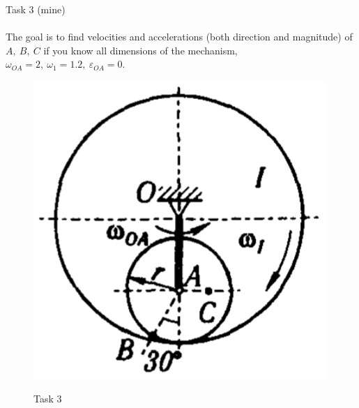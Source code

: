 \documentclass[aspectratio=169]{beamer}
\newcommand{\fbckg}[1]{\usebackgroundtemplate{\texttt{[image: \#1]}}}%
\begin{document}
\begin{frame}[t]{Task 3 (mine)}
    \framesubtitle{}
\begin{minipage}{0.6\textwidth}
The goal is to find velocities and accelerations (both direction and magnitude) of $A,\ B,\ C$ if you know all dimensions of the mechanism, $\omega_{OA}=2,\ \omega_1=1.2,\ \varepsilon_{OA}=0$.
\end{minipage}
\begin{minipage}{0.35\textwidth}
      \begin{figure}[H]
    \includegraphics[width=0.99\textwidth]{lab3_task3_fig.png}\\
    \caption*{Task 3}
    \end{figure}
\end{minipage}
\end{frame}

\fbckg{fibeamer/figs/last_page.png}
\frame[plain]{}
\end{document}
